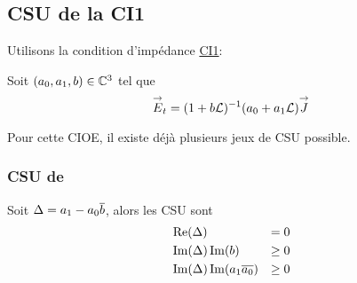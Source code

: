   \subsection{CSU de la CI1}

    Utilisons la condition d’impédance \hyperlink{ci1}{CI1}:

    Soit \((a_0, a_1,b) \in \mathbb C^3\) tel que
    \[
      {\overset{\rightarrow}{E}}_t = (1 + b \mathcal{L})^{-1} (a_0 + a_1 \mathcal{L}) {\overset{\rightarrow}{J}}
    \]

    Pour cette CIOE, il existe déjà plusieurs jeux de CSU possible.

    \subsubsection{CSU de \cite{stupfel_sufficient_2011}}

      \begin{prop}
        Soit \(\Delta = a_1 - a_0{\overline{b}}\), alors les CSU sont
        \begin{align}
          &\operatorname{Re}(\Delta) &= 0\\
          &\operatorname{Im}(\Delta)\operatorname{Im}(b) &\ge 0\\
          &\operatorname{Im}(\Delta)\operatorname{Im}(a_1{\overline{a_0}})&\ge 0
        \end{align}
      \end{prop}


